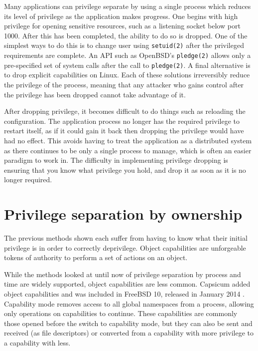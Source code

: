 \documentclass[12pt,a4paper,twoside]{report}
\begin{document}
Many applications can privilege separate by using a single process which reduces its level of privilege as the application makes progress. One begins with high privilege for opening sensitive resources, such as a listening socket below port 1000. After this has been completed, the ability to do so is dropped. One of the simplest ways to do this is to change user using \texttt{setuid(2)} after the privileged requirements are complete. An API such as OpenBSD's \texttt{pledge(2)} allows only a pre-specified set of system calls after the call to \texttt{pledge(2)}. A final alternative is to drop explicit capabilities on Linux. Each of these solutions irreversibly reduce the privilege of the process, meaning that any attacker who gains control after the privilege has been dropped cannot take advantage of it.

After dropping privilege, it becomes difficult to do things such as reloading the configuration. The application process no longer has the required privilege to restart itself, as if it could gain it back then dropping the privilege would have had no effect. This avoids having to treat the application as a distributed system as there continues to be only a single process to manage, which is often an easier paradigm to work in. The difficulty in implementing privilege dropping is ensuring that you know what privilege you hold, and drop it as soon as it is no longer required.

\section{Privilege separation by ownership}
\label{sec:priv-sep-ownership}

The previous methods shown each suffer from having to know what their initial privilege is in order to correctly deprivilege. Object capabilities are unforgeable tokens of authority to perform a set of actions on an object.

While the methods looked at until now of privilege separation by process and time are widely supported, object capabilities are less common. Capsicum added object capabilities and was included in FreeBSD 10, released in January 2014 \citep{watson_capsicum_2010}. Capability mode removes access to all global namespaces from a process, allowing only operations on capabilities to continue. These capabilities are commonly those opened before the switch to capability mode, but they can also be sent and received (as file descriptors) or converted from a capability with more privilege to a capability with less.
\end{document}

